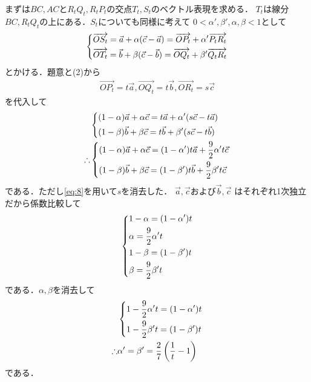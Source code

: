 \documentclass[../../main.tex]{subfiles}
\begin{document}
まずは$BC,AC$と$R_tQ_t, R_tP_t$の交点$T_t,S_t$のベクトル表現を求める．
$T_t$は線分$BC,R_tQ_t$の上にある．$S_t$についても同様に考えて
$0<\alpha',\beta',\alpha,\beta<1$として
\begin{align}
  \begin{dcases}
    \overrightarrow{OS_t} = \vec{a} + \alpha (\vec{c} - \vec{a}) = \overrightarrow{OP_t} + \alpha' \overrightarrow{P_t R_t} \\
    \overrightarrow{OT_t} = \vec{b} + \beta (\vec{c} - \vec{b}) = \overrightarrow{OQ_t} + \beta' \overrightarrow{Q_t R_t}
  \end{dcases}
\end{align}
とかける．題意と(2)から
\begin{align}
  \overrightarrow{OP_t} = t\vec{a}, \overrightarrow{OQ_t}=t\vec{b}, \overrightarrow{OR_t}=s\vec{c}
\end{align}
を代入して
\begin{align}
  &
  \begin{dcases}
    (1-\alpha)\vec{a}+\alpha\vec{c} = t\vec{a} + \alpha'(s\vec{c}-t\vec{a}) \\
    (1-\beta) \vec{b}+\beta \vec{c} = t\vec{b} + \beta'(s\vec{c}-t\vec{b})
  \end{dcases} \\
  \therefore
  &
  \begin{dcases}
    (1-\alpha)\vec{a} + \alpha\vec{c} = (1-\alpha') t \vec{a} + \dfrac{9}{2}\alpha' t \vec{c} \\
    (1-\beta)\vec{b} + \beta\vec{c} = (1-\beta') t \vec{b} + \dfrac{9}{2}\beta' t \vec{c}
  \end{dcases}
\end{align}
である．ただし\cref{eq:8}を用いて$s$を消去した．
$\vec{a}, \vec{c}$および$\vec{b}, \vec{c}$ はそれぞれ1次独立だから係数比較して
\begin{align}
  \begin{dcases}
    1-\alpha = (1-\alpha') t \\
    \alpha = \dfrac{9}{2}\alpha' t \\
    1-\beta = (1-\beta') t \\
    \beta = \dfrac{9}{2}\beta' t
  \end{dcases}
\end{align}
である．$\alpha,\beta$を消去して
\begin{align}
  &
  \begin{dcases}
    1-\dfrac{9}{2}\alpha' t = (1-\alpha') t \\
    1-\dfrac{9}{2}\beta' t = (1-\beta') t
  \end{dcases} \\
  \therefore
  &\alpha' = \beta' = \dfrac{2}{7}\left(\dfrac{1}{t}-1\right) \label{eq:14}
\end{align}
である．
\end{document}
